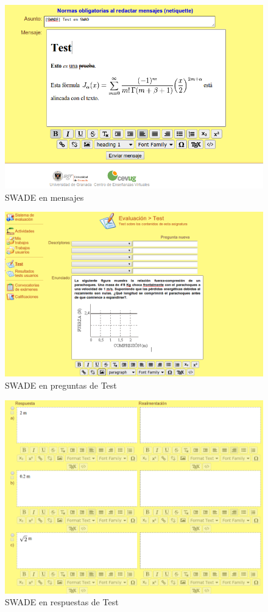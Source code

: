 \begin{figure}[h!]
  \centering
      \includegraphics[width=5in]{fig/swade_test1}
  \caption{SWADE en mensajes}
  \label{fig:swade_test1}

\end{figure}


\begin{figure}[h!]
  \centering
      \includegraphics[width=5in]{fig/result_test1}
  \caption{SWADE en preguntas de Test}
  \label{fig:result_test1}

\end{figure}


\begin{figure}[h!]
  \centering
      \includegraphics[width=5in]{fig/result_test2}
  \caption{SWADE en respuestas de Test}
  \label{fig:result_test2}

\end{figure}


